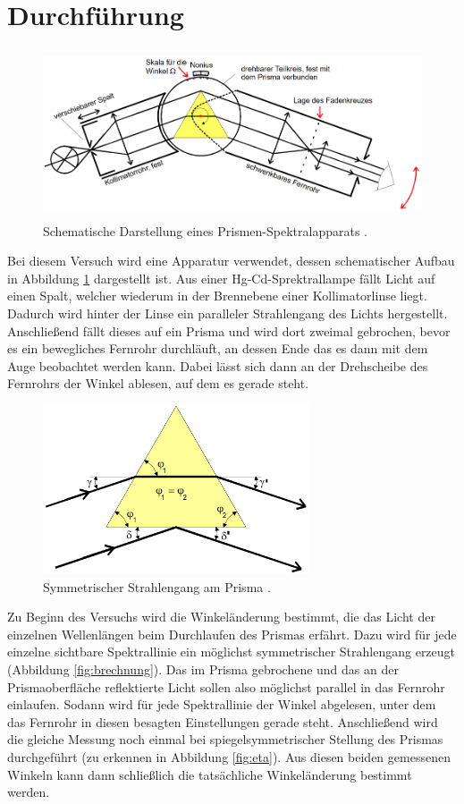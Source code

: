 \section{Durchführung}
\label{sec:Durchführung}

\begin{figure}[H]
  \centering
  \includegraphics[height=5cm]{Aufbau.PNG}
  \caption{Schematische Darstellung eines Prismen-Spektralapparats \cite{sample}.}
  \label{fig:aufbau}
\end{figure}

Bei diesem Versuch wird eine Apparatur verwendet, dessen schematischer Aufbau in Abbildung \ref{fig:aufbau}
dargestellt ist. Aus einer Hg-Cd-Sprektrallampe fällt Licht auf einen Spalt, welcher wiederum in der Brennebene
einer Kollimatorlinse liegt. Dadurch wird hinter der Linse ein paralleler Strahlengang des Lichts hergestellt.
Anschließend fällt dieses auf ein Prisma und wird dort zweimal gebrochen, bevor es ein bewegliches Fernrohr
durchläuft, an dessen Ende das es dann mit dem Auge beobachtet werden kann. Dabei lässt sich dann
an der Drehscheibe des Fernrohrs der Winkel ablesen, auf dem es gerade steht.

\begin{figure}[H]
  \centering
  \includegraphics[height=5cm]{Brechung.PNG}
  \caption{Symmetrischer Strahlengang am Prisma \cite{sample}.}
  \label{fig:brechung}
\end{figure}

Zu Beginn des Versuchs wird die Winkeländerung bestimmt, die das Licht der einzelnen Wellenlängen beim Durchlaufen des Prismas
erfährt. Dazu wird für jede einzelne sichtbare Spektrallinie ein möglichst symmetrischer Strahlengang erzeugt (Abbildung \ref{fig:brechnung}).
Das im Prisma gebrochene und das an der Prismaoberfläche reflektierte Licht sollen also möglichst parallel in das Fernrohr einlaufen.
Sodann wird für jede Spektrallinie der Winkel abgelesen, unter dem das Fernrohr in diesen besagten Einstellungen gerade steht.
Anschließend wird die gleiche Messung noch einmal bei spiegelsymmetrischer Stellung des Prismas durchgeführt (zu erkennen in Abbildung \ref{fig:eta}).
Aus diesen beiden gemessenen Winkeln kann dann schließlich die tatsächliche Winkeländerung bestimmt werden.

